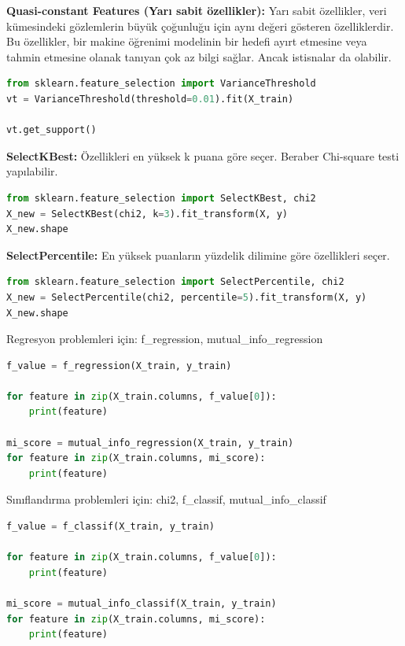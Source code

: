 \textbf{Quasi-constant Features (Yarı sabit özellikler):} Yarı sabit özellikler, veri kümesindeki gözlemlerin büyük çoğunluğu için aynı değeri gösteren özelliklerdir. Bu özellikler, bir makine öğrenimi modelinin bir hedefi ayırt etmesine veya tahmin etmesine olanak tanıyan çok az bilgi sağlar. Ancak istisnalar da olabilir.

\begin{lstlisting}[language=Python]
from sklearn.feature_selection import VarianceThreshold
vt = VarianceThreshold(threshold=0.01).fit(X_train)

vt.get_support()
\end{lstlisting}

\textbf{SelectKBest:} Özellikleri en yüksek k puana göre seçer. Beraber Chi-square testi yapılabilir.

\begin{lstlisting}[language=Python]
from sklearn.feature_selection import SelectKBest, chi2
X_new = SelectKBest(chi2, k=3).fit_transform(X, y)
X_new.shape
\end{lstlisting}

\textbf{SelectPercentile:} En yüksek puanların yüzdelik dilimine göre özellikleri seçer.

\begin{lstlisting}[language=Python]
from sklearn.feature_selection import SelectPercentile, chi2
X_new = SelectPercentile(chi2, percentile=5).fit_transform(X, y)
X_new.shape
\end{lstlisting}

Regresyon problemleri için: f\_regression, mutual\_info\_regression
\begin{lstlisting}[language=Python]
f_value = f_regression(X_train, y_train)

for feature in zip(X_train.columns, f_value[0]):
	print(feature)

mi_score = mutual_info_regression(X_train, y_train)
for feature in zip(X_train.columns, mi_score):
	print(feature)
\end{lstlisting}

Sınıflandırma problemleri için: chi2, f\_classif, mutual\_info\_classif
\begin{lstlisting}[language=Python]
f_value = f_classif(X_train, y_train)

for feature in zip(X_train.columns, f_value[0]):
	print(feature)

mi_score = mutual_info_classif(X_train, y_train)
for feature in zip(X_train.columns, mi_score):
	print(feature)
\end{lstlisting}

